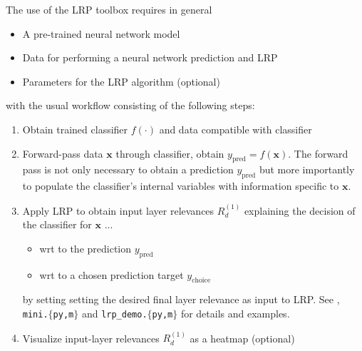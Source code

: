 \documentclass[a4wide]{article}
\newcommand{\x}{\boldsymbol{x}}
\begin{document}
The use of the LRP toolbox requires in general
\begin{itemize}
\item A pre-trained neural network model
\item Data for performing a neural network prediction and LRP
\item Parameters for the LRP algorithm (optional)
\end{itemize}
with the usual workflow consisting of the following steps:
\begin{enumerate}
\item Obtain trained classifier $f(\cdot)$ and data compatible with classifier
\item Forward-pass data $\x$ through classifier, obtain $y_{\text{pred}} = f(\x)$. The forward pass is not only necessary to obtain a prediction $y_{\text{pred}}$ but more importantly to populate the classifier's internal variables with information specific to $\x$.
\item Apply LRP to obtain input layer relevances $R^{(1)}_d$ explaining the decision of the classifier for $\x$ ...
	\begin{itemize}
		\item wrt to the prediction $y_{\text{pred}}$ 
		\item wrt to a chosen prediction target $y_{\text{choice}}$
	\end{itemize}
	by setting setting the desired final layer relevance as input to LRP. See \cite{bach15}, \texttt{mini.$\lbrace$py,m$\rbrace$} and \texttt{lrp\_demo.$\lbrace$py,m$\rbrace$} for details and examples.
\item Visualize input-layer relevances $R_d^{(1)}$ as a heatmap (optional)
\end{enumerate}
\end{document}
